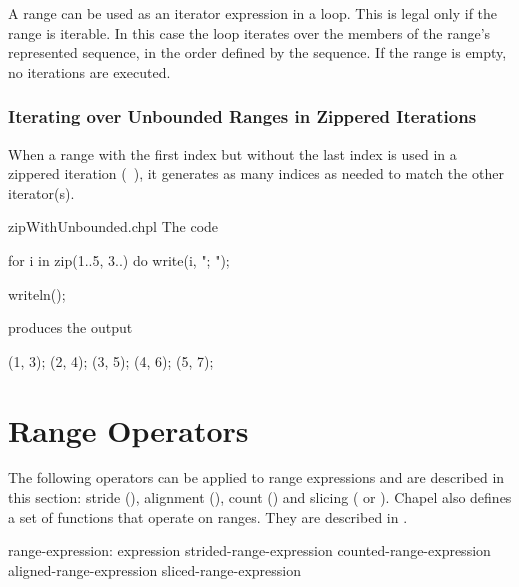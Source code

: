 A range can be used as an iterator expression in a loop. This is legal
only if the range is iterable. In this case the loop iterates over the
members of the range's represented sequence, in the order defined by
the sequence. If the range is empty, no iterations are executed.

\subsubsection{Iterating over Unbounded Ranges in Zippered Iterations}
\label{Iterating_over_Unbounded_Ranges_in_Zippered_Iterations}

When a range with the first index but without the last index is used
in a zippered iteration (~),
it generates as many indices as needed
to match the other iterator(s).

\begin{chapelexample}{zipWithUnbounded.chpl}
The code
\begin{chapel}
for i in zip(1..5, 3..) do
  write(i, "; ");
\end{chapel}
\begin{chapelpost}
writeln();
\end{chapelpost}
produces the output 
\begin{chapelprintoutput}
(1, 3); (2, 4); (3, 5); (4, 6); (5, 7); 
\end{chapelprintoutput}
\end{chapelexample}



\section{Range Operators}
\label{Range_Operators}

The following operators can be applied to range
expressions and are described in this section: stride (),
alignment (), count (\chpl{\#}) and slicing (\chpl{\(\)}
or \chpl{\[\]}).
Chapel also defines a set of functions that operate on ranges.
They are described in .

\begin{syntax}
range-expression:
  expression
  strided-range-expression
  counted-range-expression
  aligned-range-expression
  sliced-range-expression
\end{syntax}

